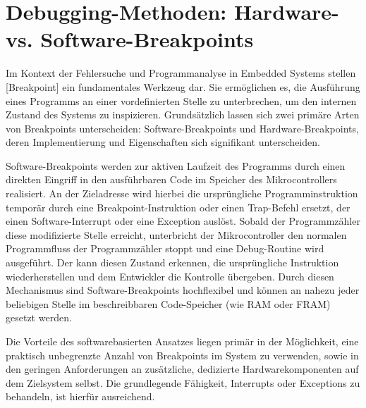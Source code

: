 
\newpage
\section{Debugging-Methoden: Hardware- vs. Software-Breakpoints}
\label{sec:Hardware_VS_Software_Breakpoints}

Im Kontext der Fehlersuche und Programmanalyse in Embedded Systems stellen [Breakpoint] ein fundamentales Werkzeug dar. Sie erm\"oglichen es, die Ausf\"uhrung eines Programms an einer vordefinierten Stelle zu unterbrechen, um den internen Zustand des Systems zu inspizieren. Grunds\"atzlich lassen sich zwei prim\"are Arten von Breakpoints unterscheiden: Software-Breakpoints und Hardware-Breakpoints, deren Implementierung und Eigenschaften sich signifikant unterscheiden.

Software-Breakpoints werden zur aktiven Laufzeit des Programms durch einen direkten Eingriff in den ausf\"uhrbaren Code im Speicher des Mikrocontrollers realisiert. An der Zieladresse wird hierbei die urspr\"ungliche Programminstruktion tempor\"ar durch eine Breakpoint-Instruktion oder einen Trap-Befehl ersetzt, der einen Software-Interrupt oder eine Exception ausl\"ost. Sobald der Programmz\"ahler diese modifizierte Stelle erreicht, unterbricht der Mikrocontroller den normalen Programmfluss der Programmz\"ahler stoppt und eine Debug-Routine wird ausgef\"uhrt. Der  kann diesen Zustand erkennen, die urspr\"ungliche Instruktion wiederherstellen und dem Entwickler die Kontrolle \"ubergeben. Durch diesen Mechanismus sind Software-Breakpoints hochflexibel und k\"onnen an nahezu jeder beliebigen Stelle im beschreibbaren Code-Speicher (wie RAM oder FRAM) gesetzt werden.

Die Vorteile des softwarebasierten Ansatzes liegen prim\"ar in der M\"oglichkeit, eine praktisch unbegrenzte Anzahl von Breakpoints im System zu verwenden, sowie in den geringen Anforderungen an zus\"atzliche, dedizierte Hardwarekomponenten auf dem Zielsystem selbst. Die grundlegende F\"ahigkeit, Interrupts oder Exceptions zu behandeln, ist hierf\"ur ausreichend. 

